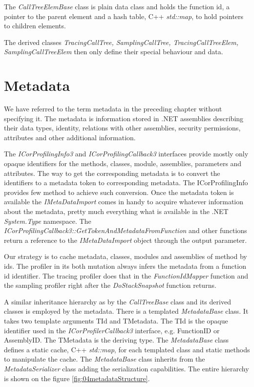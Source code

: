 The \textit{CallTreeElemBase} class is plain data class and holds the function id, a pointer to the parent element and a hash table, C++ \textit{std::map}, to hold pointers to children elements.

The derived classes \textit{TracingCallTree, SamplingCallTree, TracingCallTreeElem, SamplingCallTreeElem} then only define their special behaviour and data. 

\section{Metadata}
We have referred to the term metadata in the preceding chapter without specifying it. The metadata is information stored in .NET assemblies describing their data types, identity, relations with other assemblies, security permissions, attributes and other additional information.

The \textit{ICorProfilingInfo3} and \textit{ICorProfilingCallback3} interfaces provide mostly only opaque identifiers for the methods, classes, module, assemblies, parameters and attributes. The way to get the corresponding metadata is to convert the identifiers to a metadata token to corresponding metadata. The ICorProfilingInfo provides few method to achieve such conversion. Once the metadata token is available the \textit{IMetaDataImport} comes in handy \cite{ProfMSDNMetaData} to acquire whatever information about the metadata, pretty much everything what is available in the .NET \textit{System.Type} namespace. The \textit{ICorProfilingCallback3::GetTokenAndMetadataFromFunction} and other functions return a reference to the \textit{IMetaDataImport} object through the output parameter. 

Our strategy is to cache metadata, classes, modules and assemblies of method by ids. The profiler in its both mutation always infers the metadata from a function id identifier. The tracing profiler does that in the \textit{FunctionIdMapper} function and the sampling profiler right after the \textit{DoStackSnapshot} function returns.

A similar inheritance hierarchy as by the \textit{CallTreeBase} class and its derived classes is employed by the metadata. There is a templated \textit{MetadataBase} class. It takes two template arguments TId and TMetadata. The TId is the opaque identifier used in the \textit{ICorProfilerCallback3} interface, e.g. FunctionID or AssemblyID. The TMetadata is the deriving type. The \textit{MetadataBase} class defines a static cache, C++ \textit{std::map}, for each templated class and static methods to manipulate the cache. The \textit{MetadataBase} class inherits from the \textit{MetadataSerializer} class adding the serialization capabilities. The entire hierarchy is shown on the figure \ref{fig:04metadataStructure}.

